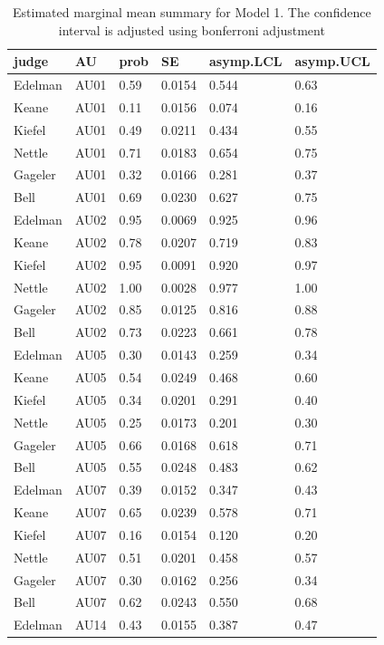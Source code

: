 \documentclass{monashthesis}
\begin{document}
\begin{table}[ht]
\begin{center}
\caption{\label{tab:result_1}Estimated marginal mean summary for Model 1. The confidence interval is adjusted using bonferroni adjustment}
\begin{tabular}{llllll}
\toprule
judge & AU & prob & SE & asymp.LCL & asymp.UCL \\
\midrule
Edelman & AU01 & 0.59 & 0.0154 & 0.544 & 0.63 \\
Keane & AU01 & 0.11 & 0.0156 & 0.074 & 0.16 \\
Kiefel & AU01 & 0.49 & 0.0211 & 0.434 & 0.55 \\
Nettle & AU01 & 0.71 & 0.0183 & 0.654 & 0.75 \\
Gageler & AU01 & 0.32 & 0.0166 & 0.281 & 0.37 \\
Bell & AU01 & 0.69 & 0.0230 & 0.627 & 0.75 \\
Edelman & AU02 & 0.95 & 0.0069 & 0.925 & 0.96 \\
Keane & AU02 & 0.78 & 0.0207 & 0.719 & 0.83 \\
Kiefel & AU02 & 0.95 & 0.0091 & 0.920 & 0.97 \\
Nettle & AU02 & 1.00 & 0.0028 & 0.977 & 1.00 \\
Gageler & AU02 & 0.85 & 0.0125 & 0.816 & 0.88 \\
Bell & AU02 & 0.73 & 0.0223 & 0.661 & 0.78 \\
Edelman & AU05 & 0.30 & 0.0143 & 0.259 & 0.34 \\
Keane & AU05 & 0.54 & 0.0249 & 0.468 & 0.60 \\
Kiefel & AU05 & 0.34 & 0.0201 & 0.291 & 0.40 \\
Nettle & AU05 & 0.25 & 0.0173 & 0.201 & 0.30 \\
Gageler & AU05 & 0.66 & 0.0168 & 0.618 & 0.71 \\
Bell & AU05 & 0.55 & 0.0248 & 0.483 & 0.62 \\
Edelman & AU07 & 0.39 & 0.0152 & 0.347 & 0.43 \\
Keane & AU07 & 0.65 & 0.0239 & 0.578 & 0.71 \\
Kiefel & AU07 & 0.16 & 0.0154 & 0.120 & 0.20 \\
Nettle & AU07 & 0.51 & 0.0201 & 0.458 & 0.57 \\
Gageler & AU07 & 0.30 & 0.0162 & 0.256 & 0.34 \\
Bell & AU07 & 0.62 & 0.0243 & 0.550 & 0.68 \\
Edelman & AU14 & 0.43 & 0.0155 & 0.387 & 0.47 \\

\end{tabular}
\end{center}
\end{table}
\end{document}
